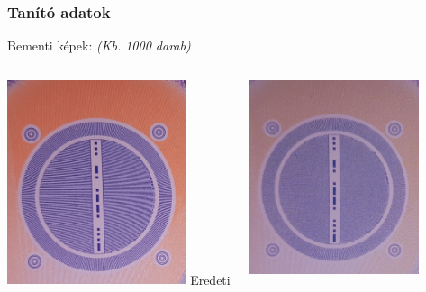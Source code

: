 \documentclass[11pt]{beamer}
\begin{document}
\begin{frame}
	\frametitle{Tanító adatok}

	Bementi képek: \textit{(Kb. 1000 darab)}
	\begin{columns}[t]

		\begin{column}{.5\textwidth}
			\includegraphics[width=0.8\textwidth, center]{img/eredeti-pelda.png}
			\centering
			Eredeti
		\end{column}
		\begin{column}{.5\textwidth}
			\includegraphics[width=0.8\textwidth, center]{img/copy-pelda.png}
			

\end{column}
\end{columns}
\end{frame}
\end{document}
